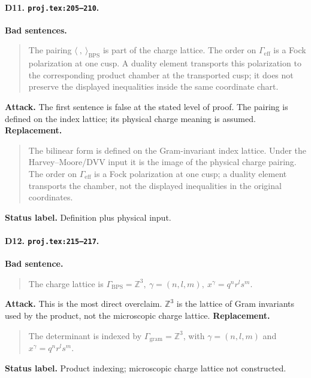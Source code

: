 \paragraph{D11. \texttt{proj.tex:205--210}.}
\textbf{Bad sentences.}
\begin{quote}\small
The pairing \(\langle\ ,\ \rangle_{\mathrm{BPS}}\) is part of the charge
lattice.  The order on \(\Gamma_{\mathrm{eff}}\) is a Fock polarization at
one cusp.  A duality element transports this polarization to the
corresponding product chamber at the transported cusp; it does not
preserve the displayed inequalities inside the same coordinate chart.
\end{quote}
\textbf{Attack.}
The first sentence is false at the stated level of proof.  The pairing is
defined on the index lattice; its physical charge meaning is assumed.
\textbf{Replacement.}
\begin{quote}\small
The bilinear form is defined on the Gram-invariant index lattice.  Under
the Harvey--Moore/DVV input it is the image of the physical charge
pairing.  The order on \(\Gamma_{\mathrm{eff}}\) is a Fock polarization at
one cusp; a duality element transports the chamber, not the displayed
inequalities in the original coordinates.
\end{quote}
\textbf{Status label.} Definition plus physical input.

\paragraph{D12. \texttt{proj.tex:215--217}.}
\textbf{Bad sentence.}
\begin{quote}\small
The charge lattice is
\(\Gamma_{\mathrm{BPS}}=\mathbb Z^3,\ \gamma=(n,l,m),\ x^\gamma=q^nr^ls^m\).
\end{quote}
\textbf{Attack.}
This is the most direct overclaim.  \(\mathbb Z^3\) is the lattice of
Gram invariants used by the product, not the microscopic charge lattice.
\textbf{Replacement.}
\begin{quote}\small
The determinant is indexed by
\(\Gamma_{\mathrm{gram}}=\mathbb Z^3\), with
\(\gamma=(n,l,m)\) and \(x^\gamma=q^nr^ls^m\).
\end{quote}
\textbf{Status label.} Product indexing; microscopic charge lattice not
constructed.

